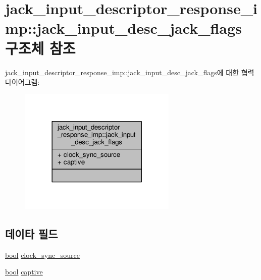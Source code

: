 \hypertarget{structavdecc__lib_1_1jack__input__descriptor__response__imp_1_1jack__input__desc__jack__flags}{}\section{jack\+\_\+input\+\_\+descriptor\+\_\+response\+\_\+imp\+:\+:jack\+\_\+input\+\_\+desc\+\_\+jack\+\_\+flags 구조체 참조}
\label{structavdecc__lib_1_1jack__input__descriptor__response__imp_1_1jack__input__desc__jack__flags}


jack\+\_\+input\+\_\+descriptor\+\_\+response\+\_\+imp\+:\+:jack\+\_\+input\+\_\+desc\+\_\+jack\+\_\+flags에 대한 협력 다이어그램\+:
\nopagebreak
\begin{figure}[H]
\begin{center}
\leavevmode
\includegraphics[width=213pt]{structavdecc__lib_1_1jack__input__descriptor__response__imp_1_1jack__input__desc__jack__flags__coll__graph}
\end{center}
\end{figure}
\subsection*{데이타 필드}
\begin{DoxyCompactItemize}
\item 
\hyperlink{avb__gptp_8h_af6a258d8f3ee5206d682d799316314b1}{bool} \hyperlink{structavdecc__lib_1_1jack__input__descriptor__response__imp_1_1jack__input__desc__jack__flags_a88fddf8263d330f180256cd941f9a329}{clock\+\_\+sync\+\_\+source}
\item 
\hyperlink{avb__gptp_8h_af6a258d8f3ee5206d682d799316314b1}{bool} \hyperlink{structavdecc__lib_1_1jack__input__descriptor__response__imp_1_1jack__input__desc__jack__flags_a5402c79a5c779cdf48abab5879fb8de4}{captive}
\end{DoxyCompactItemize}


